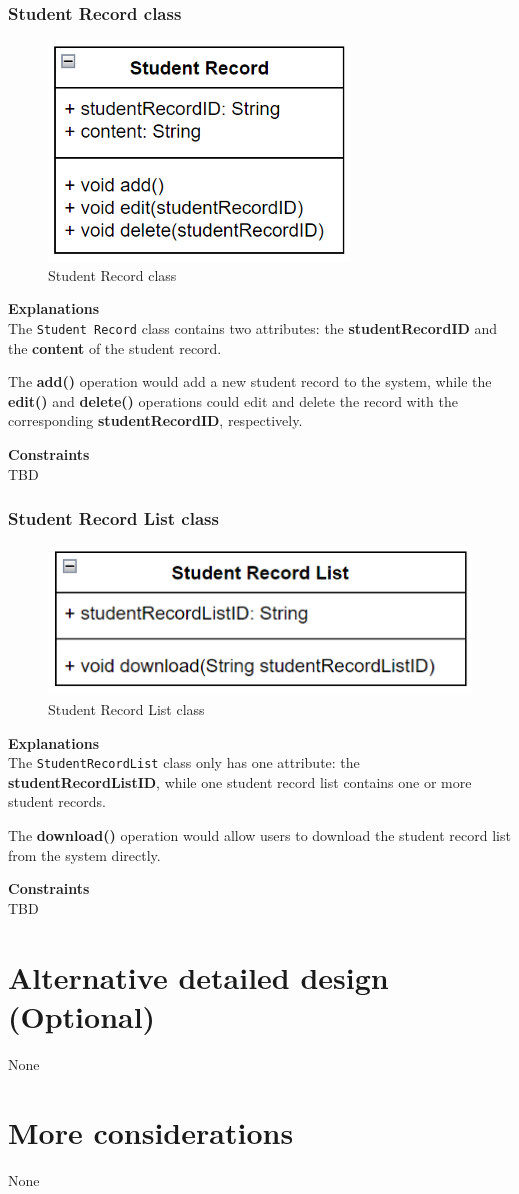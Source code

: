 \subsection{Student Record class}
\begin{figure}[H]
    \centering
    \includegraphics[width=0.5\linewidth]{picture/3-5/3-5-4.png}
    \caption{Student Record class}
    \label{fig:enter-label}
\end{figure}

\textbf{Explanations} \\
The \texttt{Student Record} class contains two attributes: the \textbf{studentRecordID} and the \textbf{content} of the student record.

The \textbf{add()} operation would add a new student record to the system, while the \textbf{edit()} and \textbf{delete()} operations could edit and delete the record with the corresponding \textbf{studentRecordID}, respectively.

\textbf{Constraints} \\
TBD

\subsection{Student Record List class}
\begin{figure}[H]
    \centering
    \includegraphics[width=0.5\linewidth]{picture/3-5/3-5-5.png}
    \caption{Student Record List class}
    \label{fig:enter-label}
\end{figure}

\textbf{Explanations} \\
The \texttt{StudentRecordList} class only has one attribute: the \textbf{studentRecordListID}, while one student record list contains one or more student records.

The \textbf{download()} operation would allow users to download the student record list from the system directly.

\textbf{Constraints} \\
TBD

\chapter{Alternative detailed design (Optional)}
None

\chapter{More considerations}
None
 
\nocite{*}
\printbibliography[heading=bibintoc]

